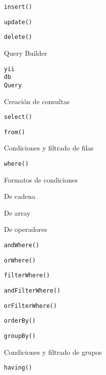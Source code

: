\begin{longenum}
\begin{longenum}
\begin{longenum}
\begin{longenum}
                \item \texttt{insert()}
                \item \texttt{update()}
                \item \texttt{delete()}
            \end{longenum}
        \end{longenum}
        \item Query Builder
        \begin{longenum}
            \item \texttt{yii\\db\\Query}
            \item Creación de consultas
            \begin{longenum}
                \item \texttt{select()}
                \item \texttt{from()}
                \item Condiciones y filtrado de filas
                \begin{longenum}
                    \item \texttt{where()}
                    \item Formatos de condiciones
                    \begin{longenum}
                        \item De cadena
                        \item De array
                        \item De operadores
                    \end{longenum}
                    \item \texttt{andWhere()}
                    \item \texttt{orWhere()}
                    \item \texttt{filterWhere()}
                    \item \texttt{andFilterWhere()}
                    \item \texttt{orFilterWhere()}
                \end{longenum}
                \item \texttt{orderBy()}
                \item \texttt{groupBy()}
                \item Condiciones y filtrado de grupos
                \begin{longenum}
                    \item \texttt{having()}

\end{longenum}
\end{longenum}
\end{longenum}
\end{longenum}
\end{longenum}
